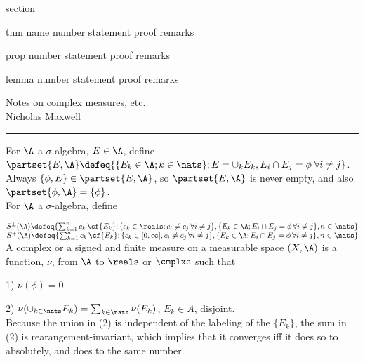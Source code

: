 


section

thm
    name
    number
    statement
    proof
    remarks
    
prop
    number
    statement
    proof
    remarks

lemma
    number
    statement
    proof
    remarks





\begin{flushleft}
Notes on complex measures, etc. \\
Nicholas Maxwell\\
\end{flushleft}

\begin{flushleft}
\addvspace{5pt} \hrule
\end{flushleft}	

For $\A$ a $\sigma$-algebra, $E \in \A$, define $\partset{E, \A} \defeq \{ \{ E_k \in \A; k \in \nats \}; E = \cup_k E_k, E_i \cap E_j = \phi \;  \forall i \not = j \}$. Always $ \{ \phi, E \} \in \partset{E, \A}$, so $\partset{E, \A}$ is never empty, and also $\partset{\phi, \A} = \{ \phi \}$.    \\

For $\A$ a $\sigma$-algebra, define 


\noindent
$S^\pm(\A) \defeq \{ \sum_{k=1}^n c_k \, \cf{E_k}; \{c_k \in\reals; c_i \not = c_j \, \forall i \not = j\}, \{E_k \in \A; E_i \cap E_j = \phi \, \forall i \not = j \}, n \in \nats \}$ \\
\noindent
$S^{+}(\A) \defeq \{ \sum_{k=1}^n c_k \, \cf{E_k}; \{c_k \in [0, \infty], c_i \not = c_j \, \forall i \not = j\}, \{E_k \in \A; E_i \cap E_j = \phi \, \forall i \not = j \}, n \in \nats \}$ \\



A complex or a signed and finite measure on a measurable space $(X,\A)$ is a function, $\nu$, from $\A$ to $\reals$ or $\cmplxs$ such that

1) $\nu(\phi) = 0$

2) $\nu( \cup_{k\in \nats} E_k ) = \sum_{k \in \nats} \nu(E_k) $, $E_k \in A$, disjoint.  \\

Because the union in (2) is independent of the labeling of the $\{ E_k \}$, the sum in (2) is rearangement-invariant, which implies that it converges iff it does so to absolutely, and does to the same number. \\

